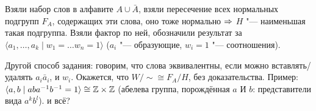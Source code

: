 \section{} %
Взяли набор слов в алфавите $A \cup \bar A$, взяли пересечение всех нормальных подгрупп $F_A$,
содержащих эти слова, оно тоже нормально $\Rightarrow$ $H$ "--- наименьшая такая подгруппа.
Взяли фактор по ней, обозначили результат за $\langle a_1, \dots, a_k \mid w_1 = \dots w_n = 1 \rangle$
($a_i$ "--- образующие, $w_i=1$ "--- соотношения).

Другой способ задания: говорим, что слова эквивалентны, если можно вставлять/удалять
$a_i\bar a_i$, и $w_i$.
Окажется, что $W/\sim \cong F_A/H$, без доказательства.
Пример: $\langle a, b \mid aba^{-1}b^{-1} = 1 \rangle \cong \mathbb{Z} \times \mathbb{Z}$
(абелева группа, порождённая $a$ И $b$: представители вида $a^kb^l$).
\TODO и всё?
